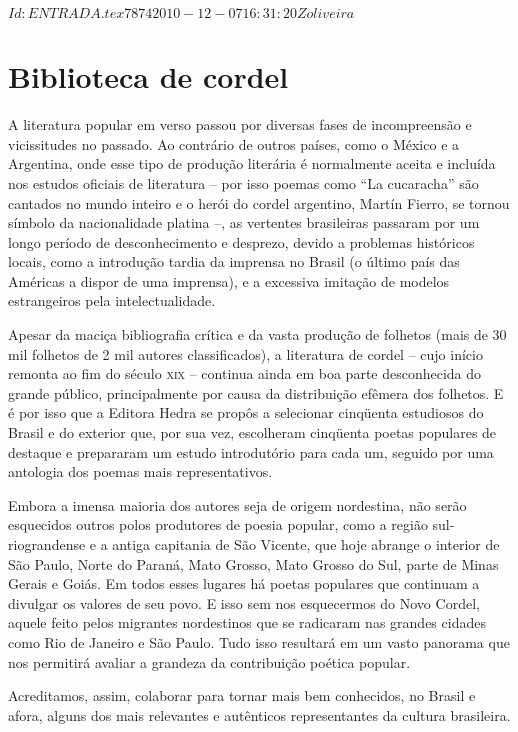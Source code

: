 \SVN $Id: ENTRADA.tex 7874 2010-12-07 16:31:20Z oliveira $

\vspace*{.15\textheight}

\section{Biblioteca de cordel}


A literatura popular em verso passou por diversas fases de incompreensão e
vicissitudes no passado. Ao contrário de outros países, como o México e a
Argentina, onde esse tipo de produção literária é normalmente aceita e incluída
nos estudos oficiais de literatura -- por isso poemas como ``La cucaracha'' são
cantados no mundo inteiro e o herói do cordel argentino, Martín Fierro, se
tornou símbolo da nacionalidade platina \mbox{--,} as vertentes brasileiras passaram por
um longo período de desconhecimento e desprezo, devido a problemas históricos
locais, como a introdução tardia da imprensa no Brasil (o último país das
Américas a dispor de uma imprensa), e a excessiva imitação de modelos
estrangeiros pela intelectualidade. 

Apesar da maciça bibliografia crítica e da vasta produção de folhetos (mais de
30 mil folhetos de 2 mil autores classificados), a literatura de cordel -- cujo
início remonta ao fim do século \textsc{xix} -- continua ainda em boa parte desconhecida
do grande público, principalmente por causa da distribuição efêmera dos
folhetos. E é por isso que a Editora Hedra se propôs a selecionar cinqüenta
estudiosos do Brasil e do exterior que, por sua vez, escolheram cinqüenta poetas
populares de destaque e prepararam um estudo introdutório para cada um, seguido
por uma antologia dos poemas mais representativos. 

Embora a imensa maioria dos autores seja de origem nordestina, não serão
esquecidos outros polos produtores de poesia popular, como a região
sul-riograndense e a antiga capitania de São Vicente, que hoje abrange o
interior de São Paulo, Norte do Paraná, Mato Grosso, Mato Grosso do Sul, parte
de Minas Gerais e Goiás. Em todos esses lugares há poetas populares que
continuam a divulgar os valores de seu povo. E isso sem nos esquecermos do Novo
Cordel, aquele feito pelos migrantes nordestinos que se radicaram nas grandes
cidades como Rio de Janeiro e São Paulo. Tudo isso resultará em um vasto
panorama que nos permitirá avaliar a grandeza da contribuição poética popular. 

Acreditamos, assim, colaborar para tornar mais bem conhecidos, no Brasil e afora,
alguns dos mais relevantes e autênticos representantes da cultura brasileira. 

